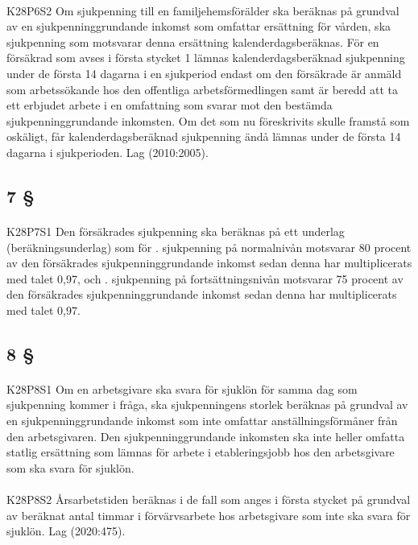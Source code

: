 \documentclass[a4paper,notitlepage,openany,10pt]{book}
\begin{document}
\paragraph*{}
{\tiny K28P6S2}
Om sjukpenning till en familjehemsförälder ska beräknas på grundval av en sjukpenninggrundande inkomst som omfattar ersättning för vården, ska sjukpenning som motsvarar denna ersättning kalenderdagsberäknas.
För en försäkrad som avses i första stycket 1 lämnas kalenderdagsberäknad sjukpenning under de första 14 dagarna i en sjukperiod endast om den försäkrade är anmäld som arbetssökande hos den offentliga arbetsförmedlingen samt är beredd att ta ett erbjudet arbete i en omfattning som svarar mot den bestämda sjukpenninggrundande inkomsten. Om det som nu föreskrivits skulle framstå som oskäligt, får kalenderdagsberäknad sjukpenning ändå lämnas under de första 14 dagarna i sjukperioden.
Lag (2010:2005).
\subsection*{7 §}
\paragraph*{}
{\tiny K28P7S1}
Den försäkrades sjukpenning ska beräknas på ett underlag (beräkningsunderlag) som för
. sjukpenning på normalnivån motsvarar 80 procent av den försäkrades sjukpenninggrundande inkomst sedan denna har multiplicerats med talet 0,97, och
. sjukpenning på fortsättningsnivån motsvarar 75 procent av den försäkrades sjukpenninggrundande inkomst sedan denna har multiplicerats med talet 0,97.
\subsection*{8 §}
\paragraph*{}
{\tiny K28P8S1}
Om en arbetsgivare ska svara för sjuklön för samma dag som sjukpenning kommer i fråga, ska sjukpenningens storlek beräknas på grundval av en sjukpenninggrundande inkomst som inte omfattar anställningsförmåner från den arbetsgivaren. Den sjukpenninggrundande inkomsten ska inte heller omfatta statlig ersättning som lämnas för arbete i etableringsjobb hos den arbetsgivare som ska svara för sjuklön.
\paragraph*{}
{\tiny K28P8S2}
Årsarbetstiden beräknas i de fall som anges i första stycket på grundval av beräknat antal timmar i förvärvsarbete hos arbetsgivare som inte ska svara för sjuklön.
Lag (2020:475).
\end{document}
